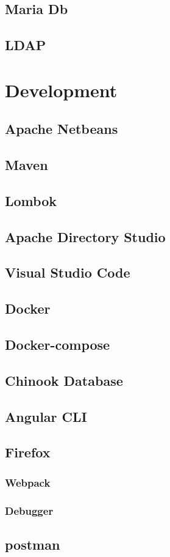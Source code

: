 \subsection{Maria Db}
\subsection{LDAP}

\section{Development}
\subsection{Apache Netbeans}
\subsection{Maven}
\subsection{Lombok}
\subsection{Apache Directory Studio}
\subsection{Visual Studio Code}
\subsection{Docker}
\subsection{Docker-compose}
\subsection{Chinook Database}
\subsection{Angular CLI}
\subsection{Firefox}
\subsubsection{Webpack}
\subsubsection{Debugger}
\subsection{postman}
